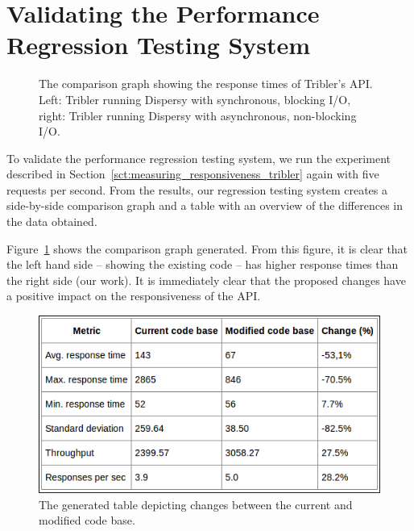 \section{Validating the Performance Regression Testing System}
\label{sct:validation_performance_regression_testing_system}

\begin{figure}[!h]
	\centering
	\caption{The comparison graph showing the response times of Tribler's API. Left: Tribler running Dispersy with synchronous, blocking I/O, right: Tribler running Dispersy with asynchronous, non-blocking I/O.}
	\label{fig:tribler_response_times_comparison}
\end{figure} 

To validate the performance regression testing system, we run the experiment described in Section~\ref{sct:measuring_responsiveness_tribler} again with five requests per second.
From the results, our regression testing system creates a side-by-side comparison graph and a table with an overview of the differences in the data obtained.

Figure~\ref{fig:tribler_response_times_comparison} shows the comparison graph generated.
From this figure, it is clear that the left hand side -- showing the existing code -- has higher response times than the right side (our work).
It is immediately clear that the proposed changes have a positive impact on the responsiveness of the API.

\begin{figure}[!h]
	\centering
	\includegraphics[width=\linewidth]{experimentation/images/table_changes}
	\caption{The generated table depicting changes between the current and modified code base.}
	\label{fig:compare_table}
\end{figure} 

